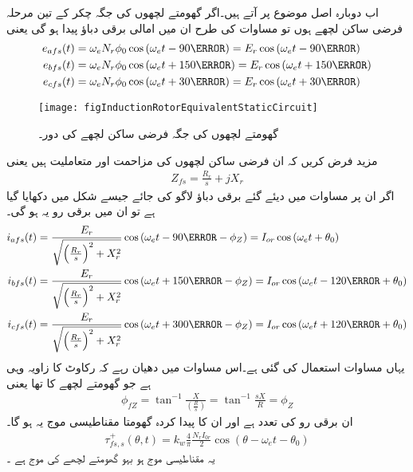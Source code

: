 اب دوبارہ اصل موضوع پر آتے ہیں۔اگر گھومتے لچھوں کی جگہ  چکر کے تین مرحلہ فرضی ساکن لچھے ہوں تو مساوات    کی طرح ان میں امالی برقی دباؤ پیدا ہو گی یعنی
\begin{gather}
\begin{aligned}\label{مساوات_امالی_تین_دباؤ}
e_{afs}(t)&=\omega_e N_r \phi_0 \cos \left(\omega_e t -90\degree \right)=E_r \cos \left(\omega_e t -90\degree \right)\\
e_{bfs}(t)&=\omega_e N_r \phi_0 \cos \left(\omega_e t +150\degree \right)=E_r \cos \left(\omega_e t +150\degree \right)\\
e_{cfs}(t)&=\omega_e N_r \phi_0 \cos \left(\omega_e t +30\degree \right)=E_r \cos \left(\omega_e t +30\degree \right)
\end{aligned}
\end{gather}
%
\begin{figure}
\centering
\texttt{[image: figInductionRotorEquivalentStaticCircuit]}
\caption{گھومتے لچھوں کی جگہ فرضی ساکن لچھے کی دور۔}
\label{شکل_امالی_گھومتی_لچھوں_کا_فرضی_مساوی_ساکن_دور}
\end{figure}

مزید فرض کریں کہ ان فرضی ساکن لچھوں کی مزاحمت   اور متعاملیت   ہیں  یعنی
\begin{align}
Z_{fs}=\frac{R_r}{s}+j X_r
\end{align}
اگر ان پر مساوات   میں دیئے گئے برقی دباؤ لاگو کی جائے جیسے شکل   میں دکھایا گیا ہے تو ان میں برقی رو یہ ہو گی۔
\begin{gather}
\begin{aligned}
i_{afs}(t)&=\frac{E_r}{\sqrt{\left(\frac{R_r}{s} \right)^2+X_r^2}} \cos \left(\omega_e t-90\degree -\phi_Z  \right)=I_{or} \cos \left(\omega_e t+\theta_0 \right)\\
i_{bfs}(t)&=\frac{E_r}{\sqrt{\left(\frac{R_r}{s} \right)^2+X_r^2}} \cos \left(\omega_e t+150\degree -\phi_Z  \right)=I_{or}\cos \left(\omega_e t-120\degree +\theta_0 \right)\\
i_{cfs}(t)&=\frac{E_r}{\sqrt{\left(\frac{R_r}{s} \right)^2+X_r^2}} \cos \left(\omega_e t+300\degree -\phi_Z  \right)=I_{or} \cos \left(\omega_e t+120\degree+\theta_0 \right)
\end{aligned}
\end{gather}
یہاں مساوات   استعمال کی گئی ہے۔اس مساوات میں دھیان رہے کہ رکاوٹ کا زاویہ   وہی ہے جو گھومتے لچھے کا تھا یعنی
\begin{align}
\phi_{fZ}=\tan^{-1} \frac{X}{\left(\frac{R}{s} \right)}=\tan^{-1} \frac{s X}{R}=\phi_Z
\end{align}
ان برقی رو کی تعدد  ہے اور ان کا پیدا کردہ گھومتا مقناطیسی موج یہ ہو گا۔
\begin{align}
\tau_{fs,s}^+(\theta,t)=k_w \frac{4}{\pi}\frac{N_r I_{0r}}{2} \cos (\theta-\omega_e t-\theta_0)
\end{align}
یہ مقناطیسی موج ہو بہو گھومتے لچھے کی موج  ہے ۔

